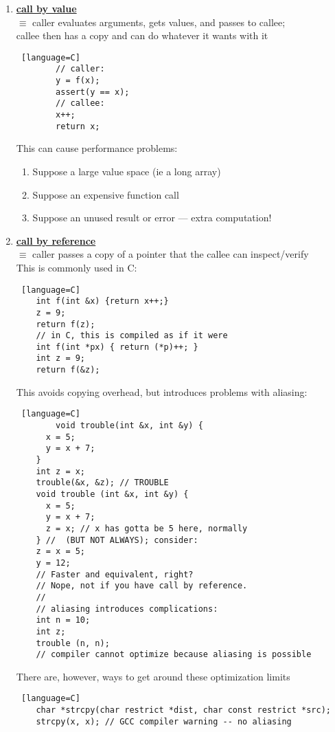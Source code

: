 \documentclass[../../lecture_notes.tex]{subfiles}
\begin{document}
\begin{enumerate} [itemsep=0mm]
	\item \textbf{\underline{call by value}}\\
		$\equiv$ caller evaluates arguments, gets values, and passes to callee;\\
				callee then has a copy and can do whatever it wants with it
		\begin{lstlisting} [language=C]
		// caller:
		y = f(x);
		assert(y == x);
		// callee:
		x++;
 		return x;
		\end{lstlisting}
 		This can cause performance problems:
		\begin{enumerate} [itemsep=0mm]
			\item Suppose a large value space (ie a long array)
			\item Suppose an expensive function call
			\item Suppose an unused result or error — extra computation!
		\end{enumerate}
	\item \textbf{\underline{call by reference}}\\
		$\equiv$ caller passes a copy of a pointer that the callee can inspect/verify\\
		This is commonly used in C:
		\begin{lstlisting} [language=C]
	int f(int &x) {return x++;}
	z = 9;
	return f(z);
	// in C, this is compiled as if it were
	int f(int *px) { return (*p)++; }
	int z = 9;
	return f(&z);
		\end{lstlisting}
		This avoids copying overhead, but introduces problems with aliasing:
		\begin{lstlisting} [language=C]
		void trouble(int &x, int &y) {
	  x = 5;
	  y = x + 7;
	}
	int z = x;
	trouble(&x, &z); // TROUBLE
	void trouble (int &x, int &y) {
	  x = 5;
	  y = x + 7;
	  z = x; // x has gotta be 5 here, normally
 	} //  (BUT NOT ALWAYS); consider:
	z = x = 5; 
	y = 12; 
	// Faster and equivalent, right?
	// Nope, not if you have call by reference.
	//
	// aliasing introduces complications:
	int n = 10;
	int z;
	trouble (n, n); 
	// compiler cannot optimize because aliasing is possible
	\end{lstlisting}
	There are, however, ways to get around these optimization limits
	\begin{lstlisting} [language=C]
	char *strcpy(char restrict *dist, char const restrict *src);
	strcpy(x, x); // GCC compiler warning -- no aliasing
		\end{lstlisting}

\end{enumerate}
\end{document}
